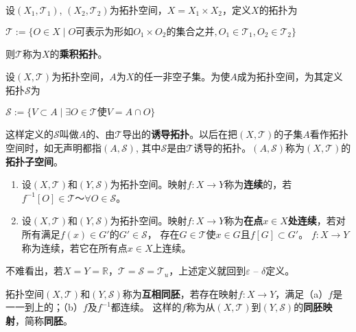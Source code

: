 \begin{example}
设$(X_1, \mathscr{T}_1)$, $(X_2, \mathscr{T}_2)$为拓扑空间，$X = X_1 \times X_2$，定义$X$的拓扑为

$\mathscr{T} := \{O \in X \mid O\text{可表示为形如}O_1 \times O_2\text{的集合之并}, O_1 \in \mathscr{T}_1, O_2 \in \mathscr{T}_2\}$

则$\mathscr{T}$称为$X$的\textbf{乘积拓扑}。
\end{example}

\begin{example}
设$(X, \mathscr{T})$为拓扑空间，$A$为$X$的任一非空子集。为使$A$成为拓扑空间，为其定义拓扑$\mathscr{S}$为

$\mathscr{S} := \{V \subset A \mid \exists O \in \mathscr{T} \text{使} V = A \cap O\}$

这样定义的$\mathscr{S}$叫做$A$的、由$\mathscr{T}$导出的\textbf{诱导拓扑}。以后在把$(X, \mathscr{T})$的子集$A$看作拓扑空间时，如无声明都指$(A, \mathscr{S})$,
其中$\mathscr{S}$是由$\mathscr{T}$诱导的拓扑。$(A, \mathscr{S})$称为$(X, \mathscr{T})$的\textbf{拓扑子空间}。
\end{example}

\begin{definition}
\begin{enumerate}[（a）]
\item 设$(X, \mathscr{T})$和$(Y, \mathscr{S})$为拓扑空间。映射$f \colon X \to Y$称为\textbf{连续}的，若$f^{-1}[O] \in \mathscr{T} ～ \forall O \in \mathscr{S}$。
\item 设$(X, \mathscr{T})$和$(Y, \mathscr{S})$为拓扑空间。映射$f \colon X \to Y$称为\textbf{在点$x \in X$处连续}，若对所有满足$f(x) \in G'$的$G' \in \mathscr{S}$， 存在$G \in \mathscr{T}$使$x \in G$且$f[G] \subset G'$。
$f \colon X \to Y$称为连续，若它在所有点$x \in X$上连续。
\end{enumerate}
\end{definition}

\begin{note}
不难看出，若$X = Y = \mathbb{R}$，$\mathscr{T} = \mathscr{S} = \mathscr{T}_u$，上述定义就回到$\varepsilon$ -- $\delta$定义。
\end{note}

\begin{definition}
拓扑空间$(X, \mathscr{T})$和$(Y, \mathscr{S})$称为\textbf{互相同胚}，若存在映射$f \colon X \to Y$，满足（a）$f$是一一到上的；（b）$f$及$f^{-1}$都连续。
这样的$f$称为从$(X, \mathscr{T})$到$(Y, \mathscr{S})$的\textbf{同胚映射}，简称\textbf{同胚}。   
\end{definition}

